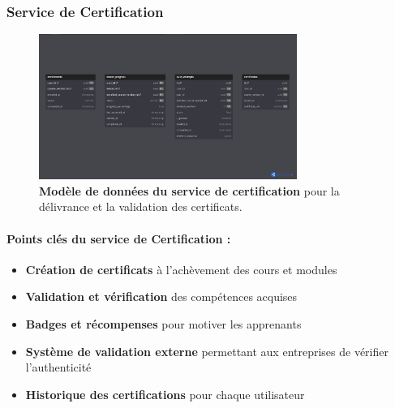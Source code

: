\subsubsection{Service de Certification}
\begin{figure}[H]
  \centering
  \includegraphics[width=0.75\textwidth,keepaspectratio]{week_1_img/services_db_screanshots/Screenshot 2025-06-06 at 15-05-53 Certification_Service.pdf.png}
  \caption{\textbf{Modèle de données du service de certification} pour la délivrance et la validation des certificats.}
  \label{fig:certification_service}
\end{figure}

\small
\paragraph{Points clés du service de Certification :}
\begin{itemize}[leftmargin=*,noitemsep,topsep=0pt]
  \item \textbf{Création de certificats} à l'achèvement des cours et modules
  \item \textbf{Validation et vérification} des compétences acquises
  \item \textbf{Badges et récompenses} pour motiver les apprenants
  \item \textbf{Système de validation externe} permettant aux entreprises de vérifier l'authenticité
  \item \textbf{Historique des certifications} pour chaque utilisateur
\end{itemize}
\normalsize

